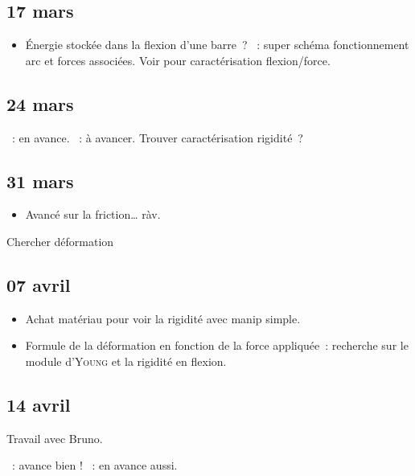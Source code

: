 \documentclass[a4paper, 11pt, final, garamond]{book}
\begin{document}
\subsection{17 mars}
\begin{itemize}
    \item Énergie stockée dans la flexion d'une barre~?
    ~: super schéma fonctionnement arc et forces associées. Voir
         pour caractérisation flexion/force.
\end{itemize}

\subsection{24 mars}
\begin{itemize}
    ~: en avance.
    ~: à avancer. Trouver caractérisation rigidité~?
\end{itemize}

\subsection{31 mars}
\begin{itemize}
  ~: à trouver (littéral).
  ~: pas avancé.
  \item Avancé sur la friction… ràv.
\end{itemize}

\begin{center}
  Chercher déformation
\end{center}

\subsection{07 avril}
\begin{itemize}
  \item Achat matériau pour voir la rigidité avec manip simple.
  \item Formule de la déformation en fonction de la force appliquée~: recherche
  sur le module d'\textsc{Young} et la rigidité en flexion.
\end{itemize}

\subsection{14 avril}
Travail avec Bruno.
\begin{itemize}
  ~: avance bien !
  ~: en avance aussi.
\end{itemize}
\end{document}
